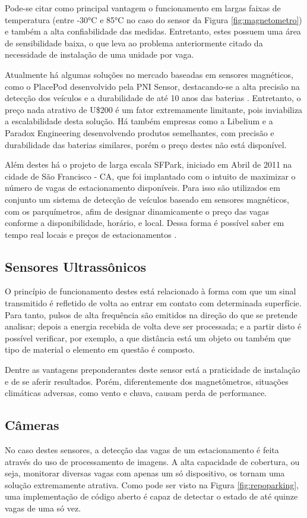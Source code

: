 \documentclass[oneside,openright,12pt]{ufsm_2015} %
\begin{document}
Pode-se citar como principal vantagem o funcionamento em largas faixas de temperatura (entre -30°C e 85°C no caso do sensor da Figura \ref{fig:magnetometro}) e também a alta confiabilidade das medidas. Entretanto, estes possuem uma área de sensibilidade baixa, o que leva ao problema anteriormente citado da necessidade de instalação de uma unidade por vaga.

Atualmente há algumas soluções no mercado baseadas em sensores magnéticos, como o PlacePod desenvolvido pela PNI Sensor, destacando-se a alta precisão na detecção dos veículos e a durabilidade de até 10 anos das baterias \cite{placepod}. Entretanto, o preço nada atrativo de U\$200 é um fator extremamente limitante, pois inviabiliza a escalabilidade desta solução. Há também empresas como a Libelium e a Paradox Engineering desenvolvendo produtos semelhantes, com precisão e durabilidade das baterias similares, porém o preço destes não está disponível.

Além destes há o projeto de larga escala SFPark, iniciado em Abril de 2011 na cidade de São Francisco - CA, que foi implantado com o intuito de maximizar o número de vagas de estacionamento disponíveis. Para isso são utilizados em conjunto um sistema de detecção de veículos baseado em sensores magnéticos, com os parquímetros, afim de designar dinamicamente o preço das vagas conforme a disponibilidade, horário, e local. Dessa forma é possível saber em tempo real locais e preços de estacionamentos \cite{site:mobilize}.


\subsection{Sensores Ultrassônicos}
O princípio de funcionamento destes está relacionado à forma com que um sinal transmitido é refletido de volta ao entrar em contato com determinada superfície. Para tanto, pulsos de alta frequência são emitidos na direção do que se pretende analisar; depois a energia recebida de volta deve ser processada; e a partir disto é possível verificar, por exemplo, a que distância está um objeto ou também que tipo de material o elemento em questão é composto.

Dentre as vantagens preponderantes deste sensor está a praticidade de instalação e de se aferir resultados. Porém, diferentemente dos magnetômetros, situações climáticas adversas, como vento e chuva, causam perda de performance.

\subsection{Câmeras}
No caso destes sensores, a detecção das vagas de um estacionamento é feita através do uso de processamento de imagens. A alta capacidade de cobertura, ou seja, monitorar diversas vagas com apenas um só dispositivo, os tornam uma solução extremamente atrativa. Como pode ser visto na Figura \ref{fig:repoparking}, uma implementação de código aberto é capaz de detectar o estado de até quinze vagas de uma só vez.
\end{document}
